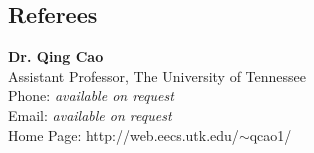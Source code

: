 \documentclass[margin, centered]{resume}
\begin{document}
\begin{resume}

\section{\mysidestyle Referees} 

\textbf{Dr. Qing Cao}\\
Assistant Professor, The University of Tennessee\\
Phone: \textsl{available on request}\\
Email: \textsl{available on request}\\
Home Page: http://web.eecs.utk.edu/$\sim$qcao1/

\end{resume}
\end{document}

